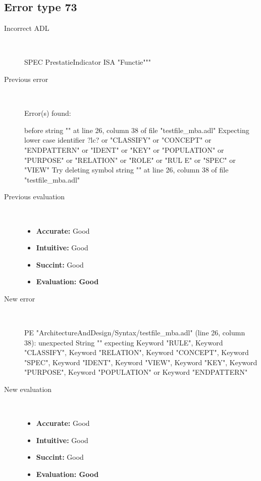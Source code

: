 \hrulefill

\subsection{Error type 73}
  \begin{description}
  \item[Incorrect ADL]~\\
\begin{adl}
SPEC PrestatieIndicator ISA "Functie"""\end{adl}
  \item[Previous error]~\\
\begin{haskell}
Error(s) found:

before string "" at line 26, column 38 of file "testfile_mba.adl"
Expecting lower case identifier ?lc? or "CLASSIFY" or "CONCEPT" or "ENDPATTERN"
or "IDENT" or "KEY" or "POPULATION" or "PURPOSE" or "RELATION" or "ROLE" or "RUL
E" or "SPEC" or "VIEW"
Try deleting symbol string "" at line 26, column 38 of file "testfile_mba.adl"\end{haskell}
  \item[Previous evaluation]~\\
    \begin{itemize}
    \item \textbf{Accurate:} Good
    \item \textbf{Intuitive:} Good
    \item \textbf{Succint:} Good
    \item \textbf{Evaluation: Good}
    \end{itemize}
  \item[New error]~\\
\begin{haskell}
PE "ArchitectureAndDesign/Syntax/testfile_mba.adl" (line 26, column 38):
unexpected String ""
expecting Keyword "RULE", Keyword "CLASSIFY", Keyword "RELATION", Keyword "CONCEPT", Keyword "SPEC", Keyword "IDENT", Keyword "VIEW", Keyword "KEY", Keyword "PURPOSE", Keyword "POPULATION" or Keyword "ENDPATTERN"\end{haskell}
  \item[New evaluation]~\\
    \begin{itemize}
    \item \textbf{Accurate:} Good
    \item \textbf{Intuitive:} Good
    \item \textbf{Succint:} Good
    \item \textbf{Evaluation: Good
}
    \end{itemize}
  \end{description}

